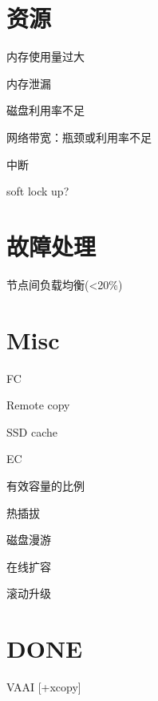 \section{资源}

\begin{tcolorbox}
\begin{compactitem}
    \item 内存使用量过大
    \item 内存泄漏
    \item 磁盘利用率不足
    \item 网络带宽：瓶颈或利用率不足
    \item 中断
    \item soft lock up?
\end{compactitem}
\end{tcolorbox}

\section{故障处理}

\begin{compactenum}
    \item {}
    \item 节点间负载均衡(<20\%)
\end{compactenum}

\section{Misc}

\begin{tcolorbox}
\begin{compactitem}
    \item FC
    \item Remote copy
    \item SSD cache
    \item EC
    \item 有效容量的比例
    \item 热插拔
    \item 磁盘漫游
    \item 在线扩容
    \item 滚动升级
\end{compactitem}
\end{tcolorbox}

\section{DONE}

\begin{compactenum}
    \item VAAI [+xcopy]
\end{compactenum}
